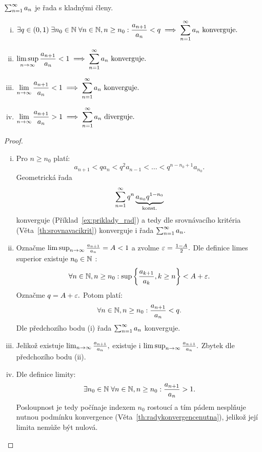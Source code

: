 \begin{theorem}
    \Necht $\sum_{n=1}^\infty a_n$ je řada s kladnými členy.
    \begin{enumerate}[(i)]
        \item $\displaystyle \exists q \in (0,1) \; \exists n_0 \in \mathbb{N} \;
            \forall n \in \mathbb{N},n\geq n_0: \frac{a_{n+1}}{a_n} < q \implies
            \sum_{n=1}^\infty a_n \text{ konverguje}.$
        \item $\displaystyle \limsup_{n\to\infty} \frac{a_{n+1}}{a_n} < 1 \implies
            \sum_{n=1}^\infty a_n \text{ konverguje}.$
        \item $\displaystyle \lim_{n \to \infty} \frac{a_{n+1}}{a_n} < 1 \implies
            \sum_{n=1}^\infty a_n \text{ konverguje}.$
        \item $\displaystyle \lim_{n \to \infty} \frac{a_{n+1}}{a_n} > 1 \implies
            \sum_{n=1}^\infty a_n \text{ diverguje}.$
    \end{enumerate}
\end{theorem}

\begin{proof}
    \leavevmode
    \begin{enumerate}[(i)]
        \item Pro $n \geq n_0$ platí:
            $$a_{n+1} < qa_n < q^2a_{n-1} < \dots < q^{n-n_0+1}a_{n_0}.$$
            Geometrická řada 
            $$\sum_{n=1}^\infty q^n\underbrace{a_{n_0}q^{1-n_0}}_{\text{konst.}}$$
            konverguje (Příklad~\ref{ex:priklady_rad}) a tedy dle srovnávacího
            kritéria (Věta~\ref{th:srovnavacikrit}) konverguje i řada $\sum_{n=1}^\infty a_n.$
        \item Označme $\limsup_{n\to\infty} \frac{a_{n+1}}{a_n} = A < 1$ a zvolme $\varepsilon = \frac{1-A}{2}.$
            Dle definice limes superior existuje $n_0 \in \mathbb{N}$ \tz:
            $$\forall n \in \mathbb{N}, n\geq n_0: \sup\left\{\frac{a_{k+1}}{a_k}, k \geq n\right\} < A + \varepsilon.$$
            Označme $q = A + \varepsilon.$ Potom platí:
            $$\forall n \in \mathbb{N}, n\geq n_0: \frac{a_{n+1}}{a_n} < q.$$
            Dle předchozího bodu (i) řada $\sum_{n=1}^\infty a_n$ konverguje.
        \item Jelikož existuje $\lim_{n \to \infty} \frac{a_{n+1}}{a_n},$ existuje i
            $\limsup_{n\to\infty} \frac{a_{n+1}}{a_n}.$ Zbytek dle předchozího bodu (ii).
        \item Dle definice limity:
            $$\exists n_0 \in \mathbb{N} \; \forall n \in \mathbb{N}, n\geq n_0: \frac{a_{n+1}}{a_n} > 1.$$
            Posloupnost je tedy počínaje indexem $n_0$ rostoucí a tím pádem nesplňuje
            nutnou podmínku konvergence (Věta~\ref{th:radykonvergencenutna}),
            jelikož její limita nemůže být nulová.
    \end{enumerate}
\end{proof}

